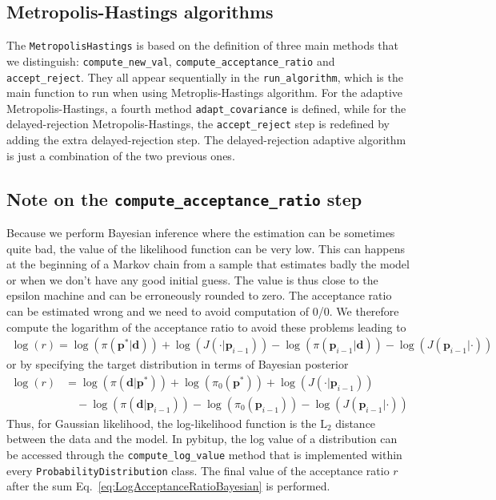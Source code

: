 \documentclass[a4paper,11pt]{article}
\begin{document}
\subsection{Metropolis-Hastings algorithms}

The \texttt{MetropolisHastings} is based on the definition of three main methods that we distinguish: \texttt{compute\_new\_val},  \texttt{compute\_acceptance\_ratio} and \texttt{accept\_reject}. They all appear sequentially in the \texttt{run\_algorithm}, which is the main function to run when using Metroplis-Hastings algorithm. For the adaptive Metropolis-Hastings, a fourth method \texttt{adapt\_covariance} is defined, while for the delayed-rejection Metropolis-Hastings, the \texttt{accept\_reject} step is redefined by adding the extra delayed-rejection step. The delayed-rejection adaptive algorithm is just a combination of the two previous ones. 

\subsection{Note on the \texttt{compute\_acceptance\_ratio} step}

Because we perform Bayesian inference where the estimation can be sometimes quite bad, the value of the likelihood function can be very low. This can happens at the beginning of a Markov chain from a sample that estimates badly the model or when we don't have any good initial guess. The value is thus close to the epsilon machine and can be erroneously rounded to zero. The acceptance ratio can be estimated wrong and we need to avoid computation of 0/0. We therefore compute the logarithm of the acceptance ratio to avoid these problems leading to 
\begin{align}
\log(r) = \log(\pi(\mathbf{p}^* | \mathbf{d})) + \log(J(\cdot | \mathbf{p}_{i-1})) - \log(\pi(\mathbf{p}_{i-1} | \mathbf{d}) ) - \log(J(\mathbf{p}_{i-1} | \cdot) ) 
\label{eq:LogAcceptanceRatio}
\end{align}
or by specifying the target distribution in terms of Bayesian posterior 
\begin{align}
\log(r) &= \log(\pi (\mathbf{d} | \mathbf{p}^*)) + \log (\pi_0(\mathbf{p}^*)) + \log(J(\cdot | \mathbf{p}_{i-1})) \nonumber \\ 
& \quad - \log(\pi(\mathbf{d} | \mathbf{p}_{i-1}))  - \log(\pi_0(\mathbf{p}_{i-1})) - \log(J(\mathbf{p}_{i-1} | \cdot) ) 
\label{eq:LogAcceptanceRatioBayesian}
\end{align}
Thus, for Gaussian likelihood, the log-likelihood function is the $\text{L}_2$ distance between the data and the model. In pybitup, the log value of a distribution can be accessed through the \texttt{compute\_log\_value} method that is implemented within every \texttt{ProbabilityDistribution} class. The final value of the acceptance ratio $r$ after the sum Eq.~\ref{eq:LogAcceptanceRatioBayesian} is performed.
\end{document}
